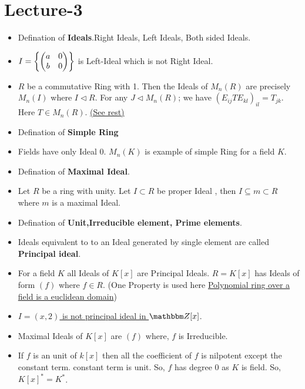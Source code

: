 \documentclass[lec]{subfiles}
\begin{document}
\section{Lecture-3}

\begin{itemize}
  \item Defination of \textbf{Ideals}.Right Ideals, Left Ideals, Both sided Ideals.
  \item $I = \qty{\begin{pmatrix} a& 0 \\ b & 0 \end{pmatrix}}$ is Left-Ideal which is not Right Ideal.
  \item $R$ be a commutative Ring with 1. Then the Ideals of $M_n(R)$ are precisely $M_n(I)$ where $I \triangleleft R$. For any $J \triangleleft M_n(R)$; we have $(E_{ij}TE_{kl})_{il} = T_{jk}$. Here $T \in M_n(R)$. \href{https://math.stackexchange.com/questions/362559/show-that-every-ideal-of-the-matrix-ring-m-nr-is-of-the-form-m-ni-where}{(See rest)}
  \item Defination of \textbf{Simple Ring}
  \item Fields have only Ideal $\qty{0}$. $M_n(K)$ is example of simple Ring for a field $K$.
  \item Defination of \textbf{Maximal Ideal}.
  \item Let $R$ be a ring with  unity. Let $ I \subset R$ be proper Ideal , then $I \subseteq m \subset R$ where $m$ is a maximal Ideal.
  \item Defination of \textbf{Unit,Irreducible element, Prime elements}.
  \item Ideals equivalent to to an Ideal generated by single element are called \textbf{Principal ideal}.
  \item For a field $K$ all Ideals of $K[x]$ are Principal Ideals. $R = K[x]$ has Ideals of form $(f)$ where $f \in R$. (One Property is used here \href{https://proofwiki.org/wiki/Polynomial_Forms_over_Field_is_Euclidean_Domain}{Polynomial ring over a field is a euclidean domain})
  \item \href{https://math.stackexchange.com/questions/36169/show-that-langle-2-x-rangle-is-not-a-principal-ideal-in-mathbb-z-x}{$I = (x,2)$ is not principal ideal in $\Z[x]$}.
  \item Maximal Ideals of $K[x]$ are $(f)$ where, $f$ is Irreducible.
  \item If $f$ is an unit of $k[x]$ then all the coefficient of $f$ is nilpotent except the constant term. constant term is unit. So, $f$ has degree $0$ as $K$ is field. So, $K[x]^* = K^*$.

\end{itemize}
\end{document}
